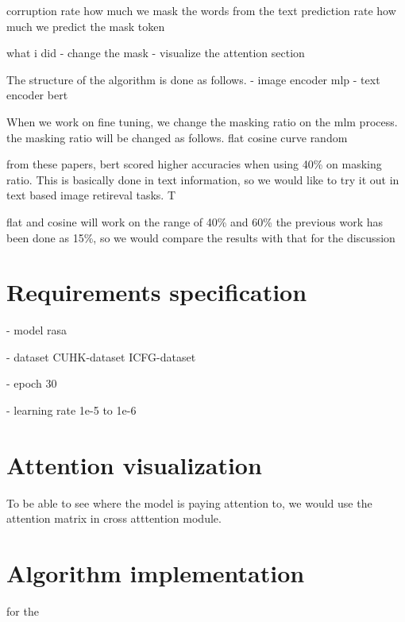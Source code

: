 corruption rate how much we mask the words from the text
prediction rate how much we predict the mask token 


what i did 
- change the mask 
- visualize the attention section

The structure of the algorithm is done as follows. 
- image encoder
  mlp 
- text encoder
  bert 

When we work on fine tuning, we change the masking ratio on the mlm process. 
the masking ratio will be changed as follows.
flat 
cosine curve 
random 

from these papers, bert scored higher accuracies when using 40\% on masking ratio. This is basically done in text information, 
so we would like to try it out in text based image retireval tasks. T

flat and cosine will work on the range of 40\% and 60\% 
the previous work has been done as 15\%, so we would compare the results with that for the discussion 

\section{Requirements specification}

- model
rasa

- dataset 
CUHK-dataset
ICFG-dataset

- epoch
30

- learning rate 
1e-5 to 1e-6

\section{Attention visualization}
To be able to see where the model is paying attention to, we would use the attention matrix in cross atttention module.



\section{Algorithm implementation}

for the 
